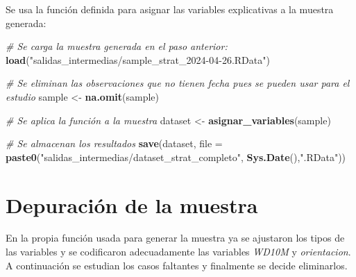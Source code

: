 \documentclass[12pt,a4paper,]{book}
\newenvironment{Shaded}{\begin{snugshade}}{\end{snugshade}}
\newcommand{\AttributeTok}[1]{\textcolor[rgb]{0.13,0.29,0.53}{#1}}
\newcommand{\CommentTok}[1]{\textcolor[rgb]{0.56,0.35,0.01}{\textit{#1}}}
\newcommand{\FunctionTok}[1]{\textcolor[rgb]{0.13,0.29,0.53}{\textbf{#1}}}
\newcommand{\NormalTok}[1]{#1}
\newcommand{\OtherTok}[1]{\textcolor[rgb]{0.56,0.35,0.01}{#1}}
\newcommand{\StringTok}[1]{\textcolor[rgb]{0.31,0.60,0.02}{#1}}
\numberwithin{dummy}{section}
\theoremstyle{ocrenumbox}
\theoremstyle{blacknumex}
\theoremstyle{blacknumbox}
\theoremstyle{ocrenum}
\theoremstyle{ocrenum}
\begin{document}
Se usa la función definida para asignar las variables explicativas a la
muestra generada:

\begin{Shaded}
\begin{Highlighting}[]
\CommentTok{\# Se carga la muestra generada en el paso anterior:}
\FunctionTok{load}\NormalTok{(}\StringTok{"salidas\_intermedias/sample\_strat\_2024{-}04{-}26.RData"}\NormalTok{)}

\CommentTok{\# Se eliminan las observaciones que no tienen fecha pues se pueden usar para el estudio}
\NormalTok{sample }\OtherTok{\textless{}{-}} \FunctionTok{na.omit}\NormalTok{(sample)}

\CommentTok{\# Se aplica la función a la muestra }
\NormalTok{dataset }\OtherTok{\textless{}{-}} \FunctionTok{asignar\_variables}\NormalTok{(sample)}

\CommentTok{\# Se almacenan los resultados}
\FunctionTok{save}\NormalTok{(dataset,}
     \AttributeTok{file =} \FunctionTok{paste0}\NormalTok{(}\StringTok{"salidas\_intermedias/dataset\_strat\_completo"}\NormalTok{,}
                   \FunctionTok{Sys.Date}\NormalTok{(),}\StringTok{".RData"}\NormalTok{))}
\end{Highlighting}
\end{Shaded}

\hypertarget{depuraciuxf3n-de-la-muestra-1}{%
\section{Depuración de la muestra}\label{depuraciuxf3n-de-la-muestra-1}}

En la propia función usada para generar la muestra ya se ajustaron los
tipos de las variables y se codificaron adecuadamente las variables
\emph{WD10M} y \emph{orientacion}. A continuación se estudian los casos
faltantes y finalmente se decide eliminarlos.
\end{document}
